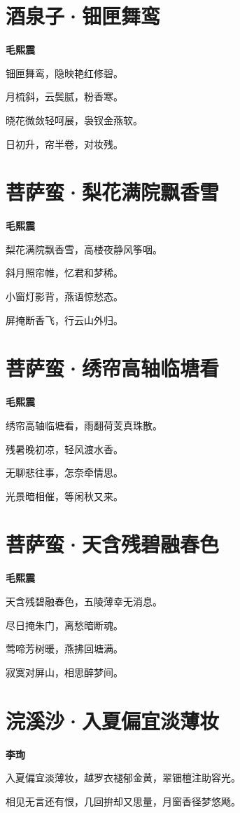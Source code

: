 \documentclass[12pt,a4paper]{ctexbook}
\begin{document}
\section{酒泉子·钿匣舞鸾}
\textbf{毛熙震}\par\vspace{0.5em}
钿匣舞鸾，隐映艳红修碧。\par
月梳斜，云鬓腻，粉香寒。\par
晓花微敛轻呵展，袅钗金燕软。\par
日初升，帘半卷，对妆残。\par

\section{菩萨蛮·梨花满院飘香雪}
\textbf{毛熙震}\par\vspace{0.5em}
梨花满院飘香雪，高楼夜静风筝咽。\par
斜月照帘帷，忆君和梦稀。\par
小窗灯影背，燕语惊愁态。\par
屏掩断香飞，行云山外归。\par

\section{菩萨蛮·绣帘高轴临塘看}
\textbf{毛熙震}\par\vspace{0.5em}
绣帘高轴临塘看，雨翻荷芰真珠散。\par
残暑晚初凉，轻风渡水香。\par
无聊悲往事，怎奈牵情思。\par
光景暗相催，等闲秋又来。\par

\section{菩萨蛮·天含残碧融春色}
\textbf{毛熙震}\par\vspace{0.5em}
天含残碧融春色，五陵薄幸无消息。\par
尽日掩朱门，离愁暗断魂。\par
莺啼芳树暖，燕拂回塘满。\par
寂寞对屏山，相思醉梦间。\par

\section{浣溪沙·入夏偏宜淡薄妆}
\textbf{李珣}\par\vspace{0.5em}
入夏偏宜淡薄妆，越罗衣褪郁金黄，翠钿檀注助容光。\par
相见无言还有恨，几回拚却又思量，月窗香径梦悠飏。\par
\end{document}
